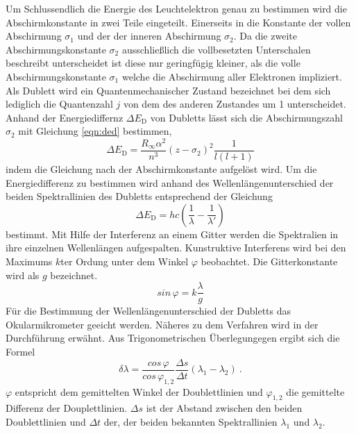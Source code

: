 Um Schlussendlich die Energie des Leuchtelektron genau zu bestimmen wird die Abschirmkonstante in zwei Teile eingeteilt. Einerseits in die Konstante der vollen Abschirmung $\sigma_1$ und der der inneren Abschirmung $\sigma_2$. Da die zweite Abschirmungskonstante $\sigma_2$ ausschließlich die vollbesetzten Unterschalen beschreibt unterscheidet ist diese nur geringfügig kleiner, als die volle Abschirmungskonstante $\sigma_1$ welche die Abschirmung aller Elektronen  impliziert. Als Dublett wird ein Quantenmechanischer Zustand bezeichnet bei dem sich lediglich die Quantenzahl $j$ von dem des anderen Zustandes um 1 unterscheidet. Anhand der Energiediffernz $\Delta E_\text{D}$ von Dubletts lässt sich die Abschirmungszahl $\sigma_2$ mit Gleichung \eqref{eqn:ded} bestimmen,
\begin{equation}
  \Delta E_\text{D} = \frac{R_{\infty} \alpha^2}{n^3} \left( z - \sigma_2 \right)^2 \frac{1}{l(l+1)}
  \label{eqn:ded}
\end{equation}
indem die Gleichung nach der Abschirmkonstante aufgelöst wird. Um die Energiedifferenz zu bestimmen wird anhand des Wellenlängenunterschied der beiden Spektrallinien des Dubletts entsprechend der Gleichung
\begin{equation}
  \Delta E_\text{D} = hc\left( \frac{1}{\lambda} - \frac{1}{\lambda'} \right)
  \label{eqn:ed}
\end{equation}
bestimmt.
Mit Hilfe der Interferenz an einem Gitter werden die Spektralien in ihre einzelnen Wellenlängen aufgespalten. Kunstruktive Interferens wird bei den Maximums $k$ter Ordung unter dem Winkel $\varphi$ beobachtet. Die Gitterkonstante wird als $g$ bezeichnet.
\begin{equation}
  sin \, \varphi = k \frac{\lambda}{g}
  \label{eqn:phi}
\end{equation}
Für die Bestimmung der Wellenlängenunterschied der Dubletts das Okularmikrometer geeicht werden. Näheres zu dem Verfahren wird in der Durchführung erwähnt. Aus Trigonometrischen Überlegungegen ergibt sich die Formel
\begin{equation}
  \delta\lambda = \frac{cos \, \varphi}{cos \, \varphi_{1,2}} \frac{\Delta s}{\Delta t}\left( \lambda_1 - \lambda_2 \right) \ .
  \label{eqn:dlam}
\end{equation}
$\varphi$ entspricht dem gemittelten Winkel der Doublettlinien und $\varphi_{1,2}$ die gemittelte Differenz der Douplettlinien. $\Delta s$ ist der Abstand zwischen den beiden Doublettlinien und $\Delta t$ der, der beiden bekannten Spektrallinien $\lambda_1$ und $\lambda_2$.

